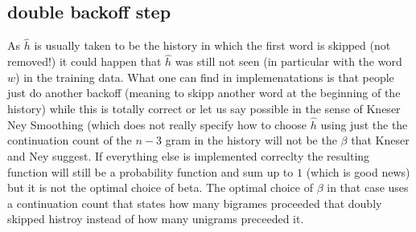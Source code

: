 \documentclass[•]{book}
\begin{document}
\begin{appendix}
\subsection{double backoff step}
As $\hat h$ is usually taken to be the history in which the first word is skipped (not removed!) it could happen that $\hat h$ was still not seen (in particular with the word $w$) in the training data. 
What one can find in implemenatations is that people just do another backoff (meaning to skipp another word at the beginning of the history) while this is totally correct or let us say possible in the sense of Kneser Ney Smoothing (which does not really specify how to choose $\hat h$ using just the the continuation count of the $n-3$ gram in the history will not be the $\beta$ that Kneser and Ney suggest. 
If everything else is implemented correclty the resulting function will still be a probability function and sum up to $1$ (which is good news) but it is not the optimal choice of beta. 
The optimal choice of $\beta$ in that case uses a continuation count that states how many bigrames proceeded that doubly skipped histroy instead of how many unigrams preceeded it.

\end{appendix}



\end{document}

